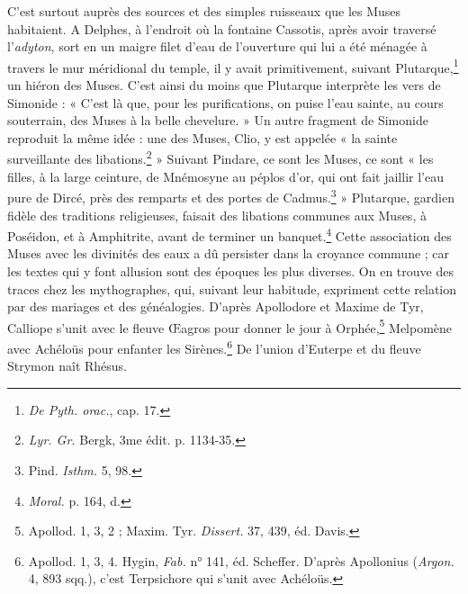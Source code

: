 \documentclass[landscape, a4paper, 11pt, oneside, polutonikogreek, french]{article}
\begin{document}
C'est surtout auprès des sources et des simples ruisseaux que les Muses habitaient. A Delphes, à l'endroit où la fontaine Cassotis, après avoir traversé l'\emph{adyton}, sort en un maigre filet d'eau de l'ouverture qui lui a été ménagée à travers le mur méridional du temple, il y avait primitivement, suivant Plutarque,\footnote{\emph{De Pyth. orac.}, cap. 17.} un hiéron des Muses. C'est ainsi du moins que Plutarque interprète les vers de Simonide : « C'est là que, pour les purifications, on puise l'eau sainte, au cours souterrain, des Muses à la belle chevelure. » Un autre fragment de Simonide reproduit la même idée : une des Muses, Clio, y est appelée « la sainte surveillante des libations.\footnote{\emph{Lyr. Gr.} Bergk, 3me édit. p. 1134-35.} » Suivant Pindare, ce sont les Muses, ce sont « les filles, à la large ceinture, de Mnémosyne au péplos d'or, qui ont fait jaillir l'eau pure de Dircé, près des remparts et des portes de Cadmus.\footnote{Pind. \emph{Isthm.} 5, 98.} » Plutarque, gardien fidèle des traditions religieuses, faisait des libations communes aux Muses, à Poséidon, et à Amphitrite, avant de terminer un banquet.\footnote{\emph{Moral.} p. 164, d.} Cette association des Muses avec les divinités des eaux a dû persister dans la croyance commune ; car les textes qui y font allusion sont des époques les plus diverses. On en trouve des traces chez les mythographes, qui, suivant leur habitude, expriment cette relation par des mariages et des généalogies. D'après Apollodore et Maxime de Tyr, Calliope s'unit avec le fleuve Œagros pour donner le jour à Orphée,\footnote{Apollod. 1, 3, 2 ; Maxim. Tyr. \emph{Dissert.} 37, 439, éd. Davis.} Melpomène avec Achéloüs pour enfanter les Sirènes.\footnote{Apollod. 1, 3, 4. Hygin, \emph{Fab.} n° 141, éd. Scheffer. D'après Apollonius (\emph{Argon.} 4, 893 sqq.), c'est Terpsichore qui s'unit avec Achéloüs.} De l'union d'Euterpe et du fleuve Strymon naît Rhésus.
\end{document}
